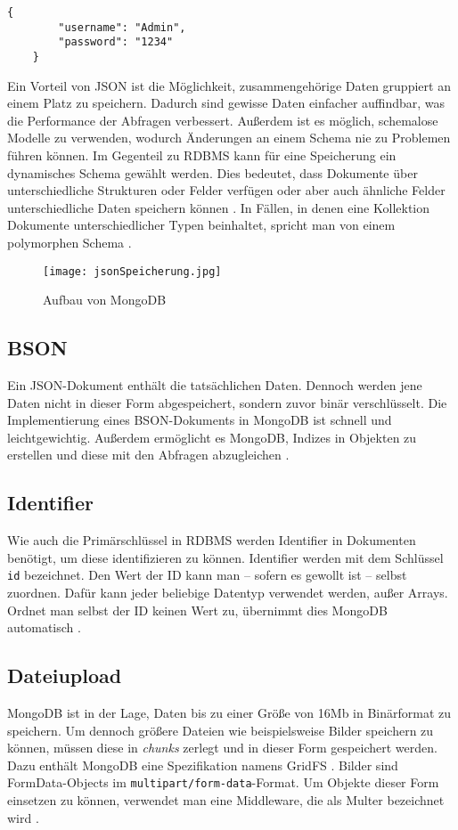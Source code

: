 \begin{lstlisting}[caption=JSON-Objekt, label=lst:jsonobjekt,float=!htb]
    {
        "username": "Admin",
        "password": "1234"
    }
\end{lstlisting}

Ein Vorteil von JSON ist die Möglichkeit, zusammengehörige Daten gruppiert an einem Platz zu speichern. Dadurch sind gewisse Daten einfacher auffindbar, was die Performance der Abfragen verbessert. Außerdem ist es möglich, schemalose Modelle zu verwenden, wodurch Änderungen an einem Schema nie zu Problemen führen können.
Im Gegenteil zu RDBMS kann für eine Speicherung ein dynamisches Schema gewählt werden. Dies bedeutet, dass Dokumente über unterschiedliche Strukturen oder Felder verfügen oder aber auch ähnliche Felder unterschiedliche Daten speichern können \cite[S.26f.]{zwei}. In Fällen, in denen eine Kollektion Dokumente unterschiedlicher Typen beinhaltet, spricht man von einem polymorphen Schema \cite[S.32]{zwei}.

\begin{figure}
    \centering
    \texttt{[image: jsonSpeicherung.jpg]}
    \label{img:jsonSpeicherung}
    \caption{Aufbau von MongoDB \cite[S.30]{zwei}}
\end{figure}

\subsection{BSON}
Ein JSON-Dokument enthält die tatsächlichen Daten. Dennoch werden jene Daten nicht in dieser Form abgespeichert, sondern zuvor binär verschlüsselt. Die Implementierung eines BSON-Dokuments in MongoDB ist schnell und leichtgewichtig. Außerdem ermöglicht es MongoDB, Indizes in Objekten zu erstellen und diese mit den Abfragen abzugleichen \cite[S.31]{zwei}. 


\subsection{Identifier}

Wie auch die Primärschlüssel in RDBMS werden Identifier in Dokumenten benötigt, um diese identifizieren zu können. Identifier werden mit dem Schlüssel \texttt{id} bezeichnet. Den Wert der ID kann man – sofern es gewollt ist – selbst zuordnen. Dafür kann jeder beliebige Datentyp verwendet werden, außer Arrays. Ordnet man selbst der ID keinen Wert zu, übernimmt dies MongoDB automatisch \cite[S.32]{zwei}.


\subsection{Dateiupload}
MongoDB ist in der Lage, Daten bis zu einer Größe von 16Mb in Binärformat zu speichern. Um dennoch größere Dateien wie beispielsweise Bilder speichern zu können, müssen diese in \textit{chunks} zerlegt und in dieser Form gespeichert werden. Dazu enthält MongoDB eine Spezifikation namens GridFS \cite{gridfs}.  Bilder sind FormData-Objects im \texttt{multipart/form-data}-Format. Um Objekte dieser Form einsetzen zu können, verwendet man eine Middleware, die als Multer bezeichnet wird \cite{multer}. 

